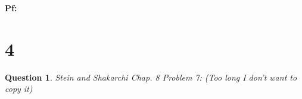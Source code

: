 \documentclass{article}
\newtheorem{question}{Question}
\begin{document}
\textbf{Pf:}

\break

\section*{4}
\begin{myBox}[]{}
    \begin{question}
        Stein and Shakarchi Chap. 8 Problem 7: (Too long I don't want to copy it)
        
        \begin{comment}
        Applying ideas of Carath'eodory, Koebe gave a proof of the Riemann mapping
        theorem by constructing (more explicitly) a sequence of functions that converges
        to the desired conformal map.

        Starting with a Koebe domain, that is, a simply connected domain $K_0\subset\mathbb{D}$ that
        is not all of $\mathbb{D}$, and which contains the origin, the strategy is to find an injective
        function $f_0$ such that $f_0(K_0)=K_1$ is a Koebe domain “larger” than $K_0$. Then, one
        iterates this process, finally obtaining functions $F_n=f_n\circ...\circ f_0 : K_0 \rightarrow\mathbb{D}$ such
        that $F_n(K_0) = K_{n+1}$ and $\lim F_n = F$ is a conformal map from $K_0$ to $\mathbb{D}$.

        The \textbf{inner radius }of a region $K\subset \mathbb{D}$ that contains the origin is defined by
        $r_K = \sup\{\rho \geq 0 : \mathbb{D}(0, \rho) \subseteq K\}$. Also, a holomorphic injection $f : K \rightarrow\mathbb{D}$ is said to
        be an \textbf{expansion} if $f(0) = 0$ and $|f(z)| > |z|$ for all $z \in K\setminus\{0\}$.

        \begin{itemize}
            \item[(a)] Prove that if $f$ is an expansion, then $r_{f(K)}\geq r_K$ and $|f'(0)|>1$.
        \end{itemize}

        Suppose we begin with a Koebe domain $K_0$ and a sequence of expansions $\{f_0,f_1,...,f_n,...\}$ so that $K_{n+1}=f_n(K_n)$ are also Koebe domains.
        We then define holomorphic maps $F_n:K_0\rightarrow\mathbb{D}$ by $F_n=f_n\circ...\circ f_0$.

        \begin{itemize}
            \item[(b)] Prove that for each $n$, the function $F_n$ is an expansion. Moreover, $F_n'(0)=\prod_{k=0}^{n}f_k'(0)$, and conclude that $\lim_{n\rightarrow\infty}|f_n'(0)|=1$.
            \item[(c)] Show that if the sequence is osculating, that is, $r_{K_n}\rightarrow 1$ as $n\rightarrow\infty$,
            then $\{F_n\}$ converges uniformly on compact subsets of $K_0$ to a conformal map $F:K_0\rightarrow\mathbb{D}$.
        \end{itemize}


\end{comment}
\end{question}
\end{myBox}
\end{document}
